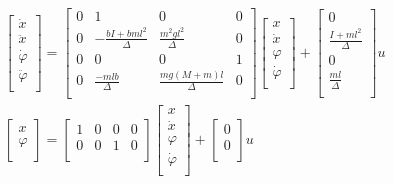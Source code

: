 \documentclass{MathorCupmodeling}
\begin{document}
\begin{equation}
\begin{aligned}
&\begin{bmatrix}
\dot x\\
\ddot x\\
\dot{\varphi}\\
\ddot{\varphi}\\
\end{bmatrix}
=
\begin{bmatrix}
0 & 1 & 0 & 0\\
0 & -\frac{bI+bml^2}{\Delta} & \frac{m^2gl^2}{\Delta} & 0\\
0 & 0 & 0 & 1\\
0 & \frac{-mlb}{\Delta} & \frac{mg(M+m)l}{\Delta} & 0\\
\end{bmatrix}
\begin{bmatrix}
x\\
\dot x\\
\varphi\\
\dot{\varphi}\\
\end{bmatrix}
+
\begin{bmatrix}
0\\
\frac{I+ml^2}{\Delta}\\
0\\
\frac{ml}{\Delta}\\
\end{bmatrix}
u\\
&\begin{bmatrix}
x\\
\varphi\\
\end{bmatrix}
=
\begin{bmatrix}
1 &0 &0 &0\\
0 &0 &1 &0\\
\end{bmatrix}
\begin{bmatrix}
x\\
\dot x\\
\varphi\\
\dot{\varphi}\\
\end{bmatrix}
+
\begin{bmatrix}
0\\
0\\
\end{bmatrix}
u\\
\end{aligned}
\end{equation}
\end{document}
